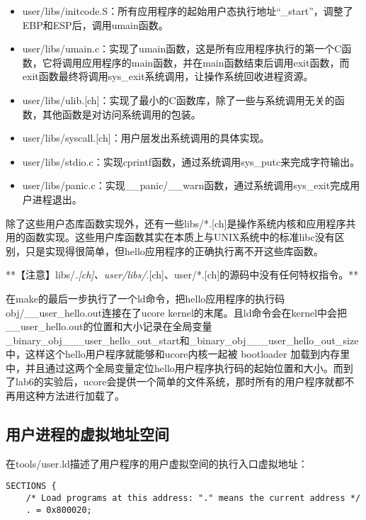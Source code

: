 \begin{itemize}
\item
  user/libs/initcode.S：所有应用程序的起始用户态执行地址``\_start''，调整了EBP和ESP后，调用umain函数。
\item
  user/libs/umain.c：实现了umain函数，这是所有应用程序执行的第一个C函数，它将调用应用程序的main函数，并在main函数结束后调用exit函数，而exit函数最终将调用sys\_exit系统调用，让操作系统回收进程资源。
\item
  user/libs/ulib.{[}ch{]}：实现了最小的C函数库，除了一些与系统调用无关的函数，其他函数是对访问系统调用的包装。
\item
  user/libs/syscall.{[}ch{]}：用户层发出系统调用的具体实现。
\item
  user/libs/stdio.c：实现cprintf函数，通过系统调用sys\_putc来完成字符输出。
\item
  user/libs/panic.c：实现\_\_panic/\_\_warn函数，通过系统调用sys\_exit完成用户进程退出。
\end{itemize}

除了这些用户态库函数实现外，还有一些libs/*.{[}ch{]}是操作系统内核和应用程序共用的函数实现。这些用户库函数其实在本质上与UNIX系统中的标准libc没有区别，只是实现得很简单，但hello应用程序的正确执行离不开这些库函数。

**【注意】libs/\emph{.{[}ch{]}、user/libs/}.{[}ch{]}、user/*.{[}ch{]}的源码中没有任何特权指令。**

在make的最后一步执行了一个ld命令，把hello应用程序的执行码obj/\_\_user\_hello.out连接在了ucore
kernel的末尾。且ld命令会在kernel中会把\_\_user\_hello.out的位置和大小记录在全局变量\_binary\_obj\_\_\_user\_hello\_out\_start和\_binary\_obj\_\_\_user\_hello\_out\_size中，这样这个hello用户程序就能够和ucore内核一起被
bootloader
加载到内存里中，并且通过这两个全局变量定位hello用户程序执行码的起始位置和大小。而到了lab6的实验后，ucore会提供一个简单的文件系统，那时所有的用户程序就都不再用这种方法进行加载了。

\subsection{用户进程的虚拟地址空间}\label{ux7528ux6237ux8fdbux7a0bux7684ux865aux62dfux5730ux5740ux7a7aux95f4}

在tools/user.ld描述了用户程序的用户虚拟空间的执行入口虚拟地址：

\begin{lstlisting}
SECTIONS {
    /* Load programs at this address: "." means the current address */
    . = 0x800020;
\end{lstlisting}

